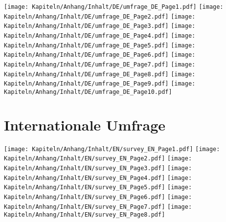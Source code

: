 \noindent
\texttt{[image: Kapiteln/Anhang/Inhalt/DE/umfrage\_DE\_Page1.pdf]}
\vfill
\newpage
\noindent
\texttt{[image: Kapiteln/Anhang/Inhalt/DE/umfrage\_DE\_Page2.pdf]}
\vfill
\newpage
\noindent
\texttt{[image: Kapiteln/Anhang/Inhalt/DE/umfrage\_DE\_Page3.pdf]}
\vfill
\newpage
\noindent
\texttt{[image: Kapiteln/Anhang/Inhalt/DE/umfrage\_DE\_Page4.pdf]}
\vfill
\newpage
\noindent
\texttt{[image: Kapiteln/Anhang/Inhalt/DE/umfrage\_DE\_Page5.pdf]}
\vfill
\newpage
\noindent
\texttt{[image: Kapiteln/Anhang/Inhalt/DE/umfrage\_DE\_Page6.pdf]}
\vfill
\newpage
\noindent
\texttt{[image: Kapiteln/Anhang/Inhalt/DE/umfrage\_DE\_Page7.pdf]}
\vfill
\newpage
\noindent
\texttt{[image: Kapiteln/Anhang/Inhalt/DE/umfrage\_DE\_Page8.pdf]}
\vfill
\newpage
\noindent
\texttt{[image: Kapiteln/Anhang/Inhalt/DE/umfrage\_DE\_Page9.pdf]}
\vfill
\newpage
\noindent
\texttt{[image: Kapiteln/Anhang/Inhalt/DE/umfrage\_DE\_Page10.pdf]}
\vfill
\newpage

\section*{Internationale Umfrage}

\noindent
\texttt{[image: Kapiteln/Anhang/Inhalt/EN/survey\_EN\_Page1.pdf]}
\vfill
\newpage
\noindent
\texttt{[image: Kapiteln/Anhang/Inhalt/EN/survey\_EN\_Page2.pdf]}
\vfill
\newpage
\noindent
\texttt{[image: Kapiteln/Anhang/Inhalt/EN/survey\_EN\_Page3.pdf]}
\vfill
\newpage
\noindent
\texttt{[image: Kapiteln/Anhang/Inhalt/EN/survey\_EN\_Page4.pdf]}
\vfill
\newpage
\noindent
\texttt{[image: Kapiteln/Anhang/Inhalt/EN/survey\_EN\_Page5.pdf]}
\vfill
\newpage
\noindent
\texttt{[image: Kapiteln/Anhang/Inhalt/EN/survey\_EN\_Page6.pdf]}
\vfill
\newpage
\noindent
\texttt{[image: Kapiteln/Anhang/Inhalt/EN/survey\_EN\_Page7.pdf]}
\vfill
\newpage
\noindent
\texttt{[image: Kapiteln/Anhang/Inhalt/EN/survey\_EN\_Page8.pdf]}
\vfill
\cleardoublepage


